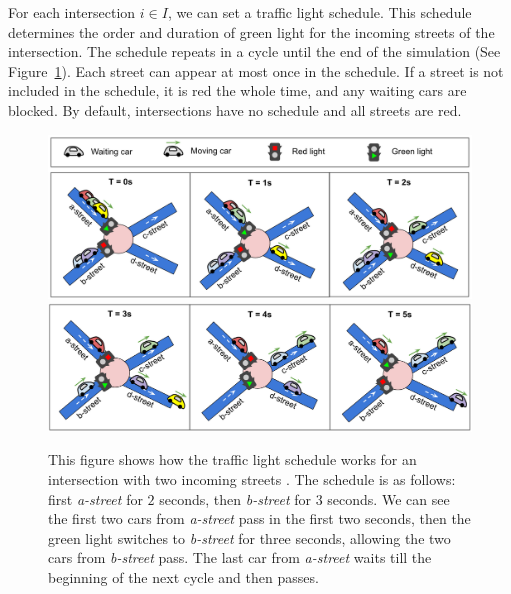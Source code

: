 
For each intersection $i \in I$, we can set a traffic light schedule. This schedule determines the order and duration of green light for the incoming streets of the intersection. The schedule repeats in a cycle until the end of the simulation (See Figure~\ref{fig:hashcode_traffic_lights}). Each street can appear at most once in the schedule. If a street is not included in the schedule, it is red the whole time, and any waiting cars are blocked. By default, intersections have no schedule and all streets are red.

\begin{figure}[ht] %
    \centering
    \includegraphics[width=\linewidth]{img/hashcode/figure2-abc.png}
    \includegraphics[width=\linewidth]{img/hashcode/figure2-def.png}
    \caption[Example of a traffic light schedule]{
        This figure shows how the traffic light schedule works for an intersection with two incoming streets \cite{google_coding_competitions}.
        The schedule is as follows: first \textit{a-street} for $2$ seconds, then \textit{b-street} for $3$ seconds.
        We can see the first two cars from \textit{a-street} pass in the first two seconds, then the green light switches to \textit{b-street} for three seconds,
        allowing the two cars from \textit{b-street} pass. The last car from \textit{a-street} waits till the beginning of the next cycle and then passes.
    }
    \label{fig:hashcode_traffic_lights}
\end{figure}

